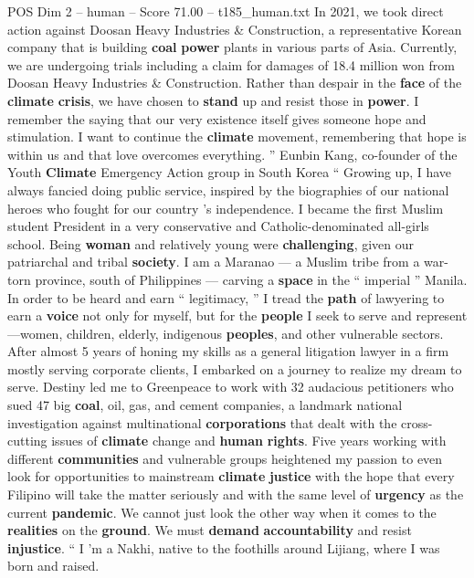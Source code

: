 \begin{textsample}{POS Dim 2 – human – Score 71.00 – t185\_human.txt}
In 2021, we took direct action against Doosan Heavy Industries \& Construction, a representative Korean company that is building \textbf{coal} \textbf{power} plants in various parts of Asia.
Currently, we are undergoing trials including a claim for damages of 18.4 million won from Doosan Heavy Industries \& Construction.
Rather than despair in the \textbf{face} of the \textbf{climate} \textbf{crisis}, we have chosen to \textbf{stand} up and resist those in \textbf{power}.
I remember the saying that our very existence itself gives someone hope and stimulation.
I want to continue the \textbf{climate} movement, remembering that hope is within us and that love overcomes everything. ” Eunbin Kang, co-founder of the Youth \textbf{Climate} Emergency Action group in South Korea “ Growing up, I have always fancied doing public service, inspired by the biographies of our national heroes who fought for our country ’s independence.
I became the first Muslim student President in a very conservative and Catholic-denominated all-girls school.
Being \textbf{woman} and relatively young were \textbf{challenging}, given our patriarchal and tribal \textbf{society}.
I am a Maranao — a Muslim tribe from a war-torn province, south of Philippines — carving a \textbf{space} in the “ imperial ” Manila.
In order to be heard and earn “ legitimacy, ” I tread the \textbf{path} of lawyering to earn a \textbf{voice} not only for myself, but for the \textbf{people} I seek to serve and represent—women, children, elderly, indigenous \textbf{peoples}, and other vulnerable sectors.
After almost 5 years of honing my skills as a general litigation lawyer in a firm mostly serving corporate clients, I embarked on a journey to realize my dream to serve.
Destiny led me to Greenpeace to work with 32 audacious petitioners who sued 47 big \textbf{coal}, oil, gas, and cement companies, a landmark national investigation against multinational \textbf{corporations} that dealt with the cross-cutting issues of \textbf{climate} change and \textbf{human} \textbf{rights}.
Five years working with different \textbf{communities} and vulnerable groups heightened my passion to even look for opportunities to mainstream \textbf{climate} \textbf{justice} with the hope that every Filipino will take the matter seriously and with the same level of \textbf{urgency} as the current \textbf{pandemic}.
We cannot just look the other way when it comes to the \textbf{realities} on the \textbf{ground}.
We must \textbf{demand} \textbf{accountability} and resist \textbf{injustice}. “ I ’m a Nakhi, native to the foothills around Lijiang, where I was born and raised.

\end{textsample}
